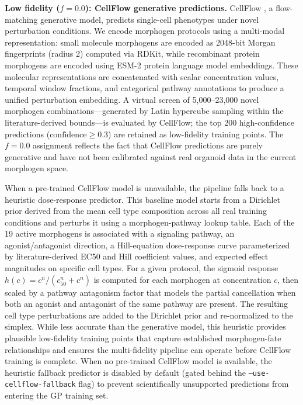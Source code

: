 \documentclass[times,twoside]{zHenriquesLab-StyleBioRxiv}
\begin{document}
\textbf{Low fidelity ($f{=}0.0$): CellFlow generative predictions.} CellFlow \cite{Klein2025cellflow}, a flow-matching generative model, predicts single-cell phenotypes under novel perturbation conditions. We encode morphogen protocols using a multi-modal representation: small molecule morphogens are encoded as 2048-bit Morgan fingerprints (radius 2) computed via RDKit, while recombinant protein morphogens are encoded using ESM-2 protein language model embeddings. These molecular representations are concatenated with scalar concentration values, temporal window fractions, and categorical pathway annotations to produce a unified perturbation embedding. A virtual screen of 5,000--23,000 novel morphogen combinations---generated by Latin hypercube sampling within the literature-derived bounds---is evaluated by CellFlow; the top 200 high-confidence predictions ($\text{confidence} \geq 0.3$) are retained as low-fidelity training points. The $f{=}0.0$ assignment reflects the fact that CellFlow predictions are purely generative and have not been calibrated against real organoid data in the current morphogen space.

When a pre-trained CellFlow model is unavailable, the pipeline falls back to a heuristic dose-response predictor. This baseline model starts from a Dirichlet prior derived from the mean cell type composition across all real training conditions and perturbs it using a morphogen-pathway lookup table. Each of the 19 active morphogens is associated with a signaling pathway, an agonist/antagonist direction, a Hill-equation dose-response curve parameterized by literature-derived EC50 and Hill coefficient values, and expected effect magnitudes on specific cell types. For a given protocol, the sigmoid response $h(c) = c^n / (c_{50}^n + c^n)$ is computed for each morphogen at concentration $c$, then scaled by a pathway antagonism factor that models the partial cancellation when both an agonist and antagonist of the same pathway are present. The resulting cell type perturbations are added to the Dirichlet prior and re-normalized to the simplex. While less accurate than the generative model, this heuristic provides plausible low-fidelity training points that capture established morphogen-fate relationships and ensures the multi-fidelity pipeline can operate before CellFlow training is complete. When no pre-trained CellFlow model is available, the heuristic fallback predictor is disabled by default (gated behind the \texttt{--use-cellflow-fallback} flag) to prevent scientifically unsupported predictions from entering the GP training set.
\end{document}
